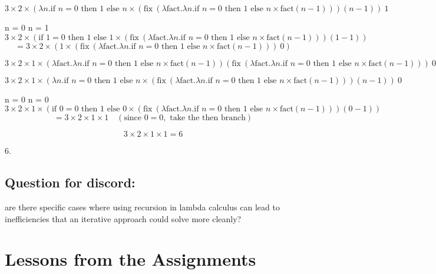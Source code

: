 \documentclass{article}
\theoremstyle{theorem}
\theoremstyle{definition}
\theoremstyle{remark}
\begin{document}
\[
3 \times 2 \times (\lambda n. \text{if } n = 0 \text{ then } 1 \text{ else } n \times (\text{fix} \ (\lambda \text{fact}. \lambda n. \text{if } n = 0 \text{ then } 1 \text{ else } n \times \text{fact}(n - 1))) (n - 1)) \ 1
\]

  n = 0  n = 1
\[
3 \times 2 \times (\text{if } 1 = 0 \text{ then } 1 \text{ else } 1 \times (\text{fix} \ (\lambda \text{fact}. \lambda n. \text{if } n = 0 \text{ then } 1 \text{ else } n \times \text{fact}(n - 1))) (1 - 1))
\]
\[
= 3 \times 2 \times (1 \times (\text{fix} \ (\lambda \text{fact}. \lambda n. \text{if } n = 0 \text{ then } 1 \text{ else } n \times \text{fact}(n - 1))) \ 0)
\]

  
\[
3 \times 2 \times 1 \times (\lambda \text{fact}. \lambda n. \text{if } n = 0 \text{ then } 1 \text{ else } n \times \text{fact}(n - 1)) (\text{fix} \ (\lambda \text{fact}. \lambda n. \text{if } n = 0 \text{ then } 1 \text{ else } n \times \text{fact}(n - 1))) \ 0
\]

\[
3 \times 2 \times 1 \times (\lambda n. \text{if } n = 0 \text{ then } 1 \text{ else } n \times (\text{fix} \ (\lambda \text{fact}. \lambda n. \text{if } n = 0 \text{ then } 1 \text{ else } n \times \text{fact}(n - 1))) (n - 1)) \ 0
\]

  n = 0  n = 0
\[
3 \times 2 \times 1 \times (\text{if } 0 = 0 \text{ then } 1 \text{ else } 0 \times (\text{fix} \ (\lambda \text{fact}. \lambda n. \text{if } n = 0 \text{ then } 1 \text{ else } n \times \text{fact}(n - 1))) (0 - 1))
\]
\[
= 3 \times 2 \times 1 \times 1 \quad (\text{since } 0 = 0, \text{ take the } \text{then} \text{ branch})
\]

\[
3 \times 2 \times 1 \times 1 = 6
\]

 6.

\subsection*{Question for discord:}
are there specific cases where using recursion in lambda calculus can lead to inefficiencies that an iterative approach could solve more cleanly?

  

\section{Lessons from the Assignments}
\end{document}
